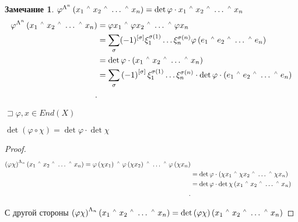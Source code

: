 \documentclass{book}
\let\latexwedge\wedge
\def\wedge{\,\raisebox{0.5ex}{\ensuremath{\scriptscriptstyle\latexwedge}\,}}
\theoremstyle{definition}
\newtheorem*{note}{Замечание}
\begin{document}
\begin{note}
    
       $\varphi^{\Lambda^n}\left( x_1\wedge x_2 \wedge \ldots \wedge x_n \right)  = \det\varphi \cdot x_1\wedge x_2\wedge \ldots \wedge x_n$
   \begin{align*} 
       \varphi^{\Lambda^n}\left( x_1\wedge x_2 \wedge \ldots \wedge x_n \right) &= \varphi x_1\wedge \varphi x_2\wedge \ldots \wedge \varphi x_n \\
                                                                                &= \sum_{\sigma}(-1)^{\left[ \sigma \right] } \xi_1^{\sigma(1)}\ldots\xi_n^{\sigma(n)}\varphi\left( e_1\wedge e_2\wedge \ldots \wedge e_n \right) \\
                                                                                &= \det \varphi \cdot  \left( x_1\wedge x_2\wedge \ldots \wedge x_n \right)  \\
                                                                                &= \sum_{\sigma}\left( -1 \right) ^{\left[ \sigma \right] }\xi_1^{\sigma(1)}\ldots\xi_n^{\sigma(n)}\cdot \det \varphi \cdot  \left( e_1\wedge e_2\wedge \ldots \wedge e_n \right)  \\
   .\end{align*}

\end{note}

$\sqsupset \varphi, x\in End(X)$

\begin{theorem}
    $\det\left( \varphi\circ \chi \right)  = \det\varphi \cdot \det \chi$
\end{theorem}
\begin{proof}
     \begin{align*}
         \left( \varphi\chi \right) ^{\Lambda_n}\left( x_1\wedge x_2\wedge \ldots \wedge x_n \right) = \varphi\left( \chi x_1 \right) \wedge \varphi\left( \chi x_2 \right) \wedge \ldots\wedge \varphi\left( \chi x_n \right) \\
         &= \det \varphi \cdot \left( \chi x_1\wedge \chi x_2 \wedge \ldots \wedge \chi x_n \right)  \\
         &= \det \varphi\cdot \det \chi\left( x_1\wedge x_2 \wedge \ldots \wedge x_n \right)  \\
    .\end{align*}

    С другой стороны $\left( \varphi \chi \right) ^{\Lambda_n}\left( x_1\wedge x_2\wedge \ldots \wedge x_n \right)  = \det\left( \varphi\chi \right) \left( x_1\wedge x_2\wedge \ldots \wedge x_n \right) $
\end{proof}
\end{document}
